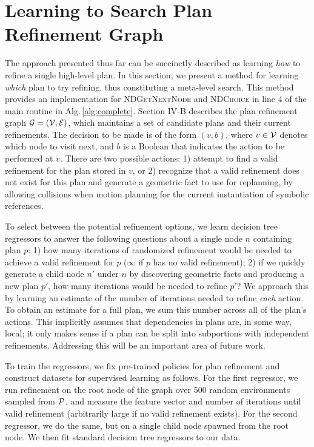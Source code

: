 \section{Learning to Search Plan Refinement Graph}
The approach presented thus far can be succinctly described as learning \emph{how} to
refine a single high-level plan. In this section, we present a method for learning
\emph{which} plan to try refining, thus constituting a meta-level search. This method
provides an implementation for \textsc{NDGetNextNode} and \textsc{NDChoice} in line 4 of the main routine in Alg.\,\ref{alg:complete}.
Section IV-B describes the plan refinement graph $\mathcal{G} = (\mathcal{V}, \mathcal{E})$,
which maintains a set of candidate plans and their current refinements. The decision to be made is of the form $(v, b)$,
where $v \in \mathcal{V}$ denotes which node to visit next, and $b$ is a Boolean that indicates the action
to be performed at $v$. There are two possible actions: 1) attempt to find a valid refinement
for the plan stored in $v$, or 2) recognize that a valid refinement does not exist for this plan
and generate a geometric fact to use for replanning, by allowing collisions when motion planning
for the current instantiation of symbolic references.

To select between the potential refinement options, we learn decision tree regressors
to answer the following questions about a single node $n$ containing plan $p$: 1) how many iterations of randomized refinement
would be needed to achieve a valid refinement for $p$ ($\infty$ if $p$ has no valid refinement); 2)
if we quickly generate a child node $n'$ under $n$ by discovering geometric facts and producing a new plan $p'$,
how many iterations would be needed to refine $p'$? We approach this by learning an estimate of the
number of iterations needed to refine \emph{each} action. To obtain an estimate for a full plan, we
sum this number across all of the plan's actions. This implicitly assumes that dependencies in plans are, in some way, local;
it only makes sense if a plan can be split into subportions with independent refinements.
Addressing this will be an important area of future work.

To train the regressors, we fix pre-trained policies for plan refinement and construct datasets
for supervised learning as follows. For the first regressor, we run refinement on the root
node of the graph over 500 random environments sampled from $\mathcal{P}$, and measure the feature vector and number of iterations
until valid refinement (arbitrarily large if no valid refinement exists).
For the second regressor, we do the same, but on a single child node spawned from the root node.
We then fit standard decision tree regressors to our data.


